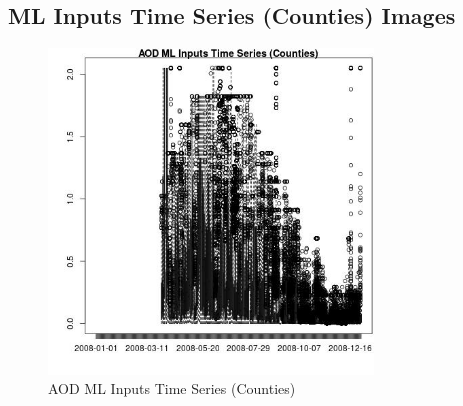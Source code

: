 
\subsection{ML Inputs Time Series (Counties) Images} 
 

\begin{figure} 
\centering  
\includegraphics[width=0.77\textwidth]{Code_Outputs/ML_input_report_ML_input_CountyGeometricCentroids_Locations_Dates_part_c_2008-01-01to2008-12-31_AODTS.jpg} 
\caption{\label{fig:ML_input_report_ML_input_CountyGeometricCentroids_Locations_Dates_part_c_2008-01-01to2008-12-31AODTS}AOD ML Inputs Time Series (Counties)} 
\end{figure} 
 
